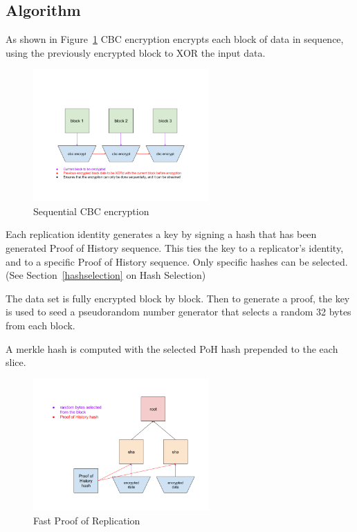 \documentclass[12pt]{ltjsarticle}
\begin{document}
\subsection{Algorithm}
As shown in Figure~\ref{fig:encrypt} CBC encryption encrypts each block of data in sequence, using the previously encrypted block to XOR the input data.

\begin{figure}
  \begin{center}
    \centering
    \includegraphics[width=0.6\textwidth]{../../figures/fig_7.png}
    \caption[Fig 7]{Sequential CBC encryption\label{fig:encrypt}}
  \end{center}
  \end{figure}

Each replication identity generates a key by signing a hash that has been generated Proof of History sequence. This ties the key to a replicator’s identity, and to a specific Proof of History sequence. Only specific hashes can be selected. (See Section~\ref{hashselection} on Hash Selection)

The data set is fully encrypted block by block. Then to generate a proof, the key is used to seed a pseudorandom number generator that selects a random 32 bytes from each block.

A merkle hash is computed with the selected PoH hash prepended to the each slice.

\begin{figure}
  \begin{center}
    \centering
    \includegraphics[width=0.6\textwidth]{../../figures/fig_8.png}
    \caption[Fig 8]{Fast Proof of Replication\label{fig_8}}
  \end{center}
  \end{figure}
\end{document}
